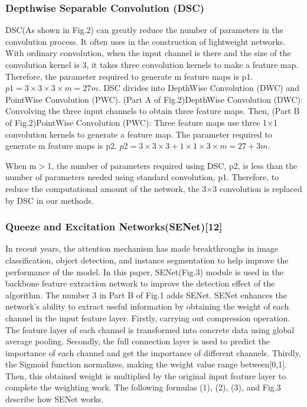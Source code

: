 \documentclass[journal]{IEEEtran}
\begin{document}
\subsubsection{Depthwise Separable 
Convolution (DSC)}
DSC(As shown in Fig.2) can greatly reduce the number of parameters in the convolution process. It often uses in the construction of lightweight networks. With ordinary convolution, when the input channel is there and the size of the convolution kernel is 3, it takes three convolution kernels to make a feature map. Therefore, the parameter required to generate m feature maps is p1.
$p 1=3 \times 3 \times 3 \times m=27m$.
 DSC divides into DepthWise Convolution (DWC) and PointWise Convolution (PWC). 
(Part A of Fig.2)DepthWise Convolution (DWC): Convolving the three input channels to obtain three feature
maps. Then, (Part B of Fig.2)PointWise
Convolution (PWC): Three feature maps use three 1×1 convolution kernels to generate a feature map. The parameter required to generate m feature maps is p2.
$p2=3 \times 3 \times 3+1 \times 1 \times 3 \times m=27+3 m.$


When m$>$1, the number of parameters required using DSC, p2, is less than the number of parameters needed using standard convolution, p1.
Therefore, to reduce the computational amount of the network, the 3$\times$3 convolution is replaced by DSC in our methods.


\subsubsection{Queeze and Excitation Networks(SENet)[12]}
In recent years, the attention mechanism has made breakthroughs in image classification, object detection, and instance segmentation to help improve the performance of the model. In this paper, SENet(Fig.3) module is used in the backbone feature extraction network to improve the detection effect of the algorithm. The number 3 in Part B of Fig.1 adds SENet.
SENet enhances the network’s ability to extract useful information by obtaining the weight of each channel in the input feature layer. Firstly, carrying out compression operation. The feature layer of each
channel is transformed into concrete data using global average pooling.
Secondly, the full connection layer is used to predict the importance of each
channel and get the importance of different channels. Thirdly, the Sigmoid
function normalizes, making the weight value range between[0,1]. Then, this
obtained weight is multiplied by the original input feature layer to complete
the weighting work. The following formulas (1), (2), (3), and Fig.3 describe how SENet works.
\end{document}

